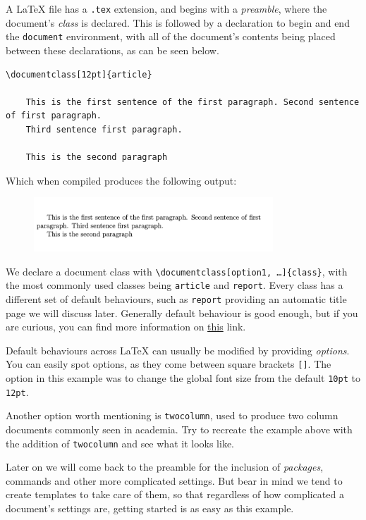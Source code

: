 A \LaTeX{} file has a \verb|.tex| extension, and begins with a \emph{preamble}, where the document's \emph{class} is declared.
This is followed by a declaration to begin and end the \texttt{document} environment, with all of the document's contents being placed between these declarations, as can be seen below.

\begin{lstlisting}[caption=\texttt{example.tex}]
\documentclass[12pt]{article}

    This is the first sentence of the first paragraph. Second sentence of first paragraph.
    Third sentence first paragraph.

    This is the second paragraph

\end{lstlisting}

Which when compiled produces the following output:
\begin{figure}[h]
    \centering
    \includegraphics[width=0.8\textwidth]{figures/chapters.png}
    \label{fig:chapters}
\end{figure}

We declare a document class with \texttt{\textbackslash documentclass[option1, \ldots]\{class\}}, with the most commonly used classes being \verb|article| and \verb|report|.
Every class has a different set of default behaviours, such as \texttt{report} providing an automatic title page we will discuss later.
Generally default behaviour is good enough, but if you are curious, you can find more information on \href{https://texblog.org/2013/02/13/latex-documentclass-options-illustrated/}{this} link.

Default behaviours across \LaTeX{} can usually be modified by providing \emph{options}.
You can easily spot options, as they come between square brackets \verb|[]|.
The option in this example was to change the global font size from the default \verb|10pt| to \verb|12pt|.

Another option worth mentioning is \verb|twocolumn|, used to produce two column documents commonly seen in academia.
Try to recreate the example above with the addition of \verb|twocolumn| and see what it looks like.

Later on we will come back to the preamble for the inclusion of \emph{packages}, commands and other more complicated settings.
But bear in mind we tend to create templates to take care of them, so that regardless of how complicated a document's settings are, getting started is as easy as this example.

